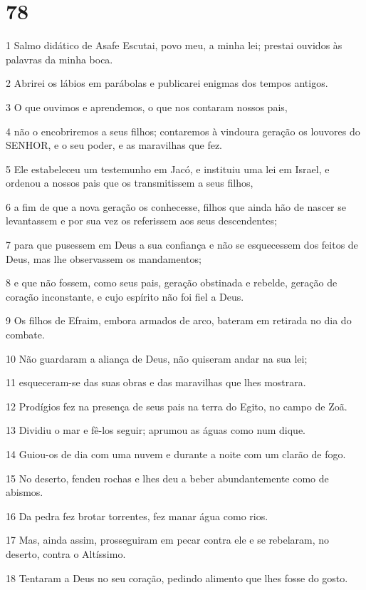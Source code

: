 \chapter{78}

\par 1 Salmo didático de Asafe Escutai, povo meu, a minha lei; prestai ouvidos às palavras da minha boca.
\par 2 Abrirei os lábios em parábolas e publicarei enigmas dos tempos antigos.
\par 3 O que ouvimos e aprendemos, o que nos contaram nossos pais,
\par 4 não o encobriremos a seus filhos; contaremos à vindoura geração os louvores do SENHOR, e o seu poder, e as maravilhas que fez.
\par 5 Ele estabeleceu um testemunho em Jacó, e instituiu uma lei em Israel, e ordenou a nossos pais que os transmitissem a seus filhos,
\par 6 a fim de que a nova geração os conhecesse, filhos que ainda hão de nascer se levantassem e por sua vez os referissem aos seus descendentes;
\par 7 para que pusessem em Deus a sua confiança e não se esquecessem dos feitos de Deus, mas lhe observassem os mandamentos;
\par 8 e que não fossem, como seus pais, geração obstinada e rebelde, geração de coração inconstante, e cujo espírito não foi fiel a Deus.
\par 9 Os filhos de Efraim, embora armados de arco, bateram em retirada no dia do combate.
\par 10 Não guardaram a aliança de Deus, não quiseram andar na sua lei;
\par 11 esqueceram-se das suas obras e das maravilhas que lhes mostrara.
\par 12 Prodígios fez na presença de seus pais na terra do Egito, no campo de Zoã.
\par 13 Dividiu o mar e fê-los seguir; aprumou as águas como num dique.
\par 14 Guiou-os de dia com uma nuvem e durante a noite com um clarão de fogo.
\par 15 No deserto, fendeu rochas e lhes deu a beber abundantemente como de abismos.
\par 16 Da pedra fez brotar torrentes, fez manar água como rios.
\par 17 Mas, ainda assim, prosseguiram em pecar contra ele e se rebelaram, no deserto, contra o Altíssimo.
\par 18 Tentaram a Deus no seu coração, pedindo alimento que lhes fosse do gosto.
